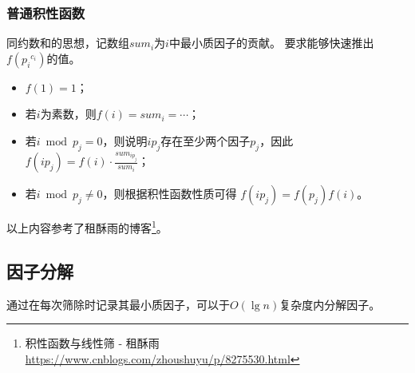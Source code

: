 \subsubsection{普通积性函数}
同约数和的思想，记数组$sum_i$为$i$中最小质因子的贡献。
要求能够快速推出$f({p_i}^{c_i})$的值。
\begin{itemize}
	\item $f(1)=1$；
	\item 若$i$为素数，则$f(i)=sum_i=\cdots$；
	\item 若$i \bmod p_j=0$，则说明$ip_j$存在至少两个因子$p_j$，因此
	      $f(ip_j)=f(i)\cdot\frac{sum_{ip_j}}{sum_i}$；
	\item 若$i \bmod p_j\neq 0$，则根据积性函数性质可得
	      $f(ip_j)=f(p_j)f(i)$。
\end{itemize}
以上内容参考了租酥雨的博客\footnote{积性函数与线性筛 - 租酥雨
	\url{https://www.cnblogs.com/zhoushuyu/p/8275530.html}}。
\subsection{因子分解}
通过在每次筛除时记录其最小质因子，可以于$O(\lg n)$复杂度内分解因子。
